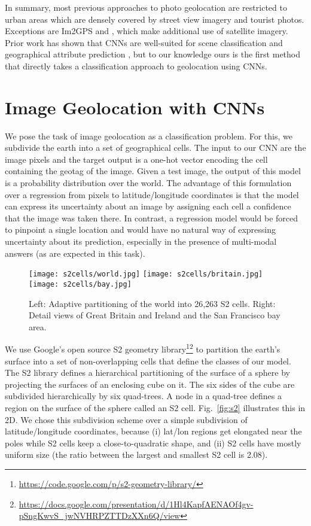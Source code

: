 \documentclass[10pt,twocolumn,letterpaper]{article}
\begin{document}
In summary, most previous approaches to photo geolocation are
restricted to urban areas which are densely covered by street view
imagery and tourist photos. Exceptions are Im2GPS
\cite{Hays14MLEVI,Hays08CVPR} and
\cite{Lin13CVPR,Lin15CVPR,Workman15ICCV}, which make additional use of
satellite imagery. Prior work has shown that CNNs are well-suited for
scene classification \cite{Xiao14IJCV} and geographical attribute
prediction \cite{Zhang15WACV}, but to our knowledge ours is the first
method that directly takes a classification approach to geolocation
using CNNs.

\section{Image Geolocation with CNNs}
\label{sec:method}
We pose the task of image geolocation as a classification problem.
For this, we subdivide the earth into a set of geographical cells.
The input to our CNN are the image pixels and the
target output is a one-hot vector encoding the cell containing the
geotag of the image. Given a test image,
the output of this model is a probability
distribution over the world. The advantage of this formulation over a
regression from pixels to latitude/longitude coordinates is that the
model can express its uncertainty about an image by assigning each
cell a confidence that the image was taken there. In contrast, a
regression model would be forced to pinpoint a single location and
would have no natural way of expressing uncertainty about its
prediction, especially in the presence of multi-modal answers (as are
expected in this task).

\begin{figure*}[t]
  \centering
  \texttt{[image: s2cells/world.jpg]}
  \texttt{[image: s2cells/britain.jpg]}   \texttt{[image: s2cells/bay.jpg]}
  \caption{Left: Adaptive partitioning of the world into 26,263 S2 cells. Right: Detail views of Great Britain and Ireland and the San Francisco bay area.}
  \label{fig:s2_partitioning}
\end{figure*}
We use Google's open source S2 geometry
library\footnote{\href{https://code.google.com/p/s2-geometry-library/}{https://code.google.com/p/s2-geometry-library/}}\footnote{\href{https://docs.google.com/presentation/d/1Hl4KapfAENAOf4gv-pSngKwvS\_jwNVHRPZTTDzXXn6Q/view}{https://docs.google.com/presentation/d/1Hl4KapfAENAOf4gv-pSngKwvS\_jwNVHRPZTTDzXXn6Q/view}}
to partition the earth's surface into a set of non-overlapping cells
that define the classes of our model. The S2 library defines a
hierarchical partitioning of the surface of a sphere by projecting the
surfaces of an enclosing cube on it. The six sides of the cube are
subdivided hierarchically by six quad-trees. A node in a quad-tree
defines a region on the surface of the sphere called an S2 cell.
Fig.~\ref{fig:s2} illustrates this in 2D.
We chose this subdivision scheme over a simple subdivision of
latitude/longitude coordinates, because (i) lat/lon regions get
elongated near the poles while S2 cells keep a close-to-quadratic
shape, and (ii) S2 cells have mostly uniform size (the ratio between
the largest and smallest S2 cell is 2.08).
\end{document}

